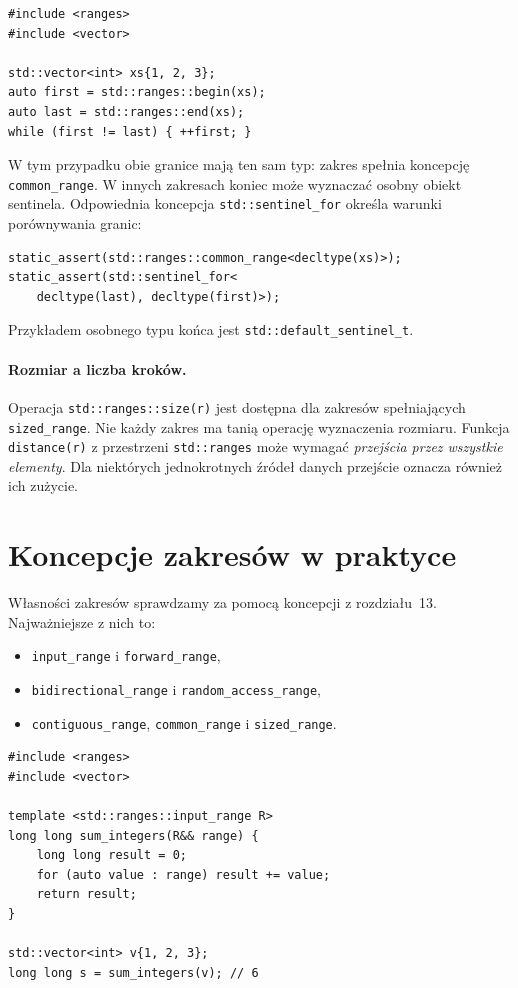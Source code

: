 \begin{lstlisting}
#include <ranges>
#include <vector>

std::vector<int> xs{1, 2, 3};
auto first = std::ranges::begin(xs);
auto last = std::ranges::end(xs);
while (first != last) { ++first; }
\end{lstlisting}

W tym przypadku obie granice mają ten sam typ: zakres spełnia
koncepcję \texttt{common\_range}. W innych zakresach koniec może
wyznaczać osobny obiekt sentinela. Odpowiednia koncepcja
\texttt{std::sentinel\_for} określa warunki porównywania granic:

\begin{lstlisting}
static_assert(std::ranges::common_range<decltype(xs)>);
static_assert(std::sentinel_for<
    decltype(last), decltype(first)>);
\end{lstlisting}

Przykładem osobnego typu końca jest \texttt{std::default\_sentinel\_t}.

\paragraph{Rozmiar a liczba kroków.}
Operacja \texttt{std::ranges::size(r)} jest dostępna dla zakresów
spełniających \texttt{sized\_range}. Nie każdy zakres ma tanią operację
wyznaczenia rozmiaru. Funkcja \texttt{distance(r)} z przestrzeni
\texttt{std::ranges} może wymagać
\emph{przejścia przez wszystkie elementy}. Dla niektórych
jednokrotnych źródeł danych przejście oznacza również ich zużycie.

\section{Koncepcje zakresów w praktyce}

Własności zakresów sprawdzamy za pomocą koncepcji z rozdziału~13.
Najważniejsze z nich to:
\begin{itemize}
\item \texttt{input\_range} i \texttt{forward\_range},
\item \texttt{bidirectional\_range} i \texttt{random\_access\_range},
\item \texttt{contiguous\_range}, \texttt{common\_range} i \texttt{sized\_range}.
\end{itemize}

\begin{lstlisting}
#include <ranges>
#include <vector>

template <std::ranges::input_range R>
long long sum_integers(R&& range) {
    long long result = 0;
    for (auto value : range) result += value;
    return result;
}

std::vector<int> v{1, 2, 3};
long long s = sum_integers(v); // 6
\end{lstlisting}

